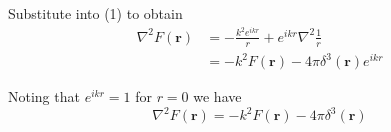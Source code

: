Substitute into (1) to obtain
\begin{align*}
\nabla^2F(\mathbf r)&=-\frac{k^2e^{ikr}}{r}+e^{ikr}\nabla^2\frac{1}{r}
\\
&=-k^2F(\mathbf r)-4\pi\delta^3(\mathbf r)e^{ikr}
\end{align*}

Noting that $e^{ikr}=1$ for $r=0$ we have
\begin{equation*}
\nabla^2F(\mathbf r)=-k^2F(\mathbf r)-4\pi\delta^3(\mathbf r)\tag{4}
\end{equation*}


